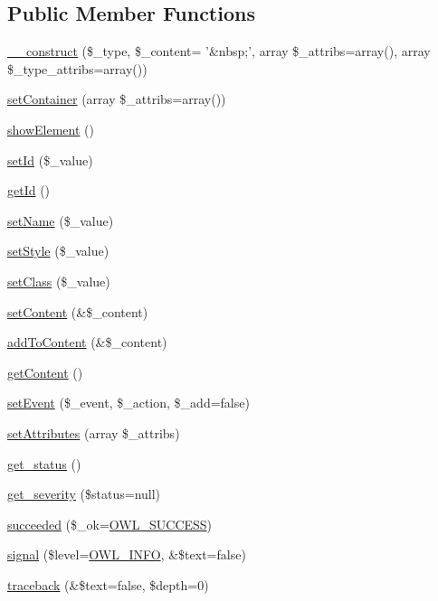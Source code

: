 \subsection*{Public Member Functions}
\begin{DoxyCompactItemize}
\item 
\hyperlink{classContainer_a799507f94eb27d074923dff88d419235}{\_\-\_\-construct} (\$\_\-type, \$\_\-content= '\&nbsp;', array \$\_\-attribs=array(), array \$\_\-type\_\-attribs=array())
\item 
\hyperlink{classContainer_a17fea842ea2b30a98527daae82e19f7c}{setContainer} (array \$\_\-attribs=array())
\item 
\hyperlink{classContainer_a966af30a8c244fbc2ee61648fa59ffe3}{showElement} ()
\item 
\hyperlink{classBaseElement_a0c1ce3d1684ecb78960cf7a97278494e}{setId} (\$\_\-value)
\item 
\hyperlink{classBaseElement_a4a7aa583ee21af392908d7fd42fde790}{getId} ()
\item 
\hyperlink{classBaseElement_a39bafb3609d10048920c20242c2a04c5}{setName} (\$\_\-value)
\item 
\hyperlink{classBaseElement_a6b2b9ff69f6e92db82f91d9c55cda697}{setStyle} (\$\_\-value)
\item 
\hyperlink{classBaseElement_af6597b30fa9798878f6290271043dfa2}{setClass} (\$\_\-value)
\item 
\hyperlink{classBaseElement_a164a9c6e4ee68afa0ad343942ba54d28}{setContent} (\&\$\_\-content)
\item 
\hyperlink{classBaseElement_abd48eef64ca4f419f26d66a0c0419908}{addToContent} (\&\$\_\-content)
\item 
\hyperlink{classBaseElement_af8c86b93bcdcfbc415bf96c622dc5516}{getContent} ()
\item 
\hyperlink{classBaseElement_ad5789f45f16aaa144716ee8558069c31}{setEvent} (\$\_\-event, \$\_\-action, \$\_\-add=false)
\item 
\hyperlink{classBaseElement_a7d8ddd64ceb3401a7cb84548656b3709}{setAttributes} (array \$\_\-attribs)
\item 
\hyperlink{class__OWL_a99ec771fa2c5c279f80152cc09e489a8}{get\_\-status} ()
\item 
\hyperlink{class__OWL_adf9509ef96858be7bdd9414c5ef129aa}{get\_\-severity} (\$status=null)
\item 
\hyperlink{class__OWL_ae76c46aff1ad253106332670fc59c777}{succeeded} (\$\_\-ok=\hyperlink{owl_8severitycodes_8php_a96223f06ba27bf5cbefa6e9d702897c2}{OWL\_\-SUCCESS})
\item 
\hyperlink{class__OWL_a51ba4a16409acf2a2f61f286939091a5}{signal} (\$level=\hyperlink{owl_8severitycodes_8php_a139328861128689f2f4def6a399d9057}{OWL\_\-INFO}, \&\$text=false)
\item 
\hyperlink{class__OWL_aa29547995d6741b7d2b90c1d4ea99a13}{traceback} (\&\$text=false, \$depth=0)
\end{DoxyCompactItemize}
